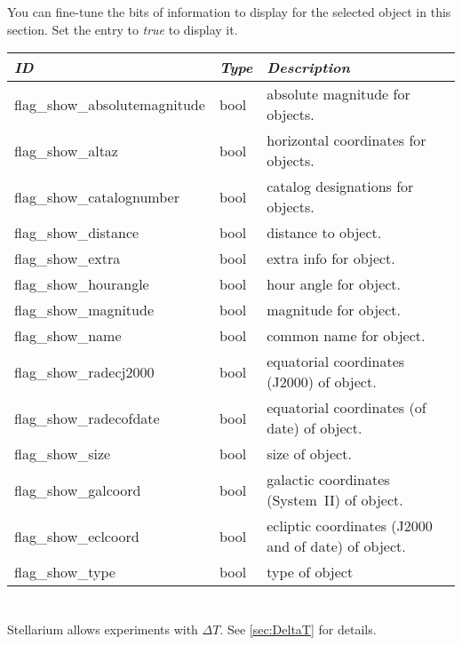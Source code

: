 You can fine-tune the bits of information to display for the selected object in this section. Set the entry to \emph{true} to display it.

\begin{longtabu} to \textwidth {l|l|X}\toprule
\emph{ID} & \emph{Type} & \emph{Description}\\\midrule
flag\_show\_absolutemagnitude & bool & absolute magnitude for objects.\\\midrule
flag\_show\_altaz             & bool & horizontal coordinates for objects.\\\midrule
flag\_show\_catalognumber     & bool & catalog designations for objects.\\\midrule
flag\_show\_distance          & bool & distance to object.\\\midrule
flag\_show\_extra             & bool & extra info for object.\\\midrule
flag\_show\_hourangle         & bool & hour angle for object.\\\midrule
flag\_show\_magnitude         & bool & magnitude for object.\\\midrule
flag\_show\_name              & bool & common name for object.\\\midrule
flag\_show\_radecj2000        & bool & equatorial coordinates (J2000) of object.\\\midrule
flag\_show\_radecofdate       & bool & equatorial coordinates (of date) of object.\\\midrule
flag\_show\_size              & bool & size of object.\\\midrule
flag\_show\_galcoord          & bool & galactic coordinates (System~II) of object.\\\midrule
flag\_show\_eclcoord          & bool & ecliptic coordinates (J2000 and of date) of object.\\\midrule
flag\_show\_type              & bool & type of object\\\bottomrule
\end{longtabu}


\section{}
\label{sec:config.ini:custom_time_correction}

Stellarium allows experiments with $\Delta T$. See \ref{sec:DeltaT} for details.

